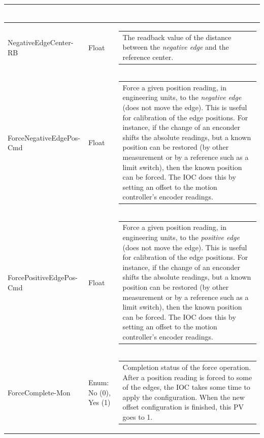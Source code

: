 \documentclass[openany]{article}
\begin{document}
\begin{longtable}{| m{4.5cm} m{2.5cm}  m{7.0cm} |}
\begin{tabular}{@{}m{6cm}@{}}
            \end{tabular} \hypertarget{}{}\\ \hline
        NegativeEdgeCenter-RB & Float & \begin{tabular}{@{}m{6cm}@{}}
                The readback value of the distance between the \emph{negative edge} and the reference center.
            \end{tabular} \hypertarget{pv:force-negative-edge-pos-cmd}{}\\ \hline
        ForceNegativeEdgePos-Cmd & Float & \begin{tabular}{@{}m{6cm}@{}}
                Force a given position reading, in engineering units, to the \emph{negative edge} (does not move the edge). This is useful for calibration of the edge positions. For instance, if the change of an enconder shifts the absolute readings, but a known position can be restored (by other measurement or by a reference such as a limit switch), then the known position can be forced. The IOC does this by setting an offset to the motion controller's encoder readings.
            \end{tabular} \hypertarget{pv:force-positive-edge-pos-cmd}{}\\ \hline
        ForcePositiveEdgePos-Cmd & Float & \begin{tabular}{@{}m{6cm}@{}}
                Force a given position reading, in engineering units, to the \emph{positive edge} (does not move the edge). This is useful for calibration of the edge positions. For instance, if the change of an enconder shifts the absolute readings, but a known position can be restored (by other measurement or by a reference such as a limit switch), then the known position can be forced. The IOC does this by setting an offset to the motion controller's encoder readings.
            \end{tabular} \hypertarget{pv:force-complete-mon}{}\\ \hline
        ForceComplete-Mon & Enum: No (0), Yes (1) & \begin{tabular}{@{}m{6cm}@{}}
                Completion status of the force operation. After a position reading is forced to some of the edges, the IOC takes some time to apply the configuration. When the new offset configuration is finished, this PV goes to 1.
            \end{tabular} \hypertarget{pv:home-cmd}{}\\ \hline

\end{longtable}
\end{document}
